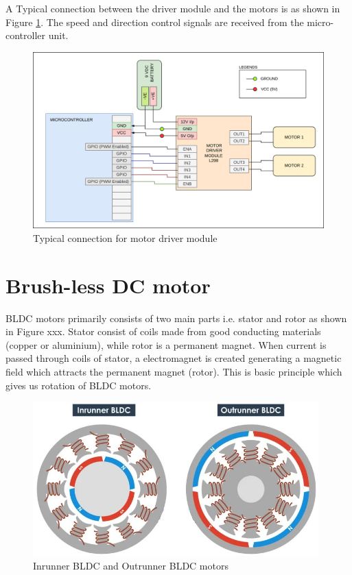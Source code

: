 A Typical connection between the driver module and the motors is as shown in Figure \ref{Driver_module_connection}. The speed and direction control signals are received from the micro-controller unit.

\begin{figure}[h!]
\centering
\includegraphics[width=\columnwidth]{./Figures/Driver_module_connection.png}
\caption{Typical connection for motor driver module}
\label{Driver_module_connection}
\end{figure}

\newpage
\section{Brush-less DC motor}
\par BLDC motors primarily consists of two main parts i.e. stator and rotor as shown in Figure xxx. Stator consist of coils made from good conducting materials (copper or aluminium), while rotor is a permanent magnet. When current is passed through coils of stator, a electromagnet is created generating a magnetic field which attracts the permanent magnet (rotor). This is basic principle which gives us rotation of BLDC motors.

\begin{figure}[h!]
\centering
\includegraphics[width=11cm]{./Figures/BLDC_runner.jpg}
\caption{Inrunner BLDC and Outrunner BLDC motors}
\label{BLDC_runner}
\end{figure}

